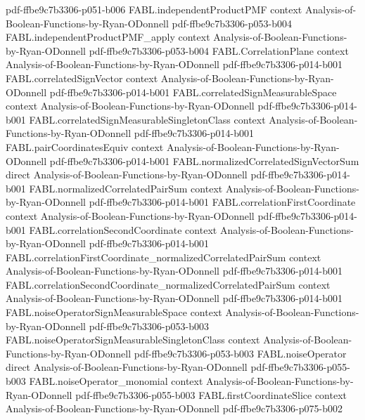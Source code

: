 \begin{theorem}
  {pdf-ffbe9c7b3306-p051-b006}
\proofstep
  {FABL.independentProductPMF}
  {context}
  {Analysis-of-Boolean-Functions-by-Ryan-ODonnell}
  {pdf-ffbe9c7b3306-p053-b004}
\proofstep
  {FABL.independentProductPMF_apply}
  {context}
  {Analysis-of-Boolean-Functions-by-Ryan-ODonnell}
  {pdf-ffbe9c7b3306-p053-b004}
\proofstep
  {FABL.CorrelationPlane}
  {context}
  {Analysis-of-Boolean-Functions-by-Ryan-ODonnell}
  {pdf-ffbe9c7b3306-p014-b001}
\proofstep
  {FABL.correlatedSignVector}
  {context}
  {Analysis-of-Boolean-Functions-by-Ryan-ODonnell}
  {pdf-ffbe9c7b3306-p014-b001}
\proofstep
  {FABL.correlatedSignMeasurableSpace}
  {context}
  {Analysis-of-Boolean-Functions-by-Ryan-ODonnell}
  {pdf-ffbe9c7b3306-p014-b001}
\proofstep
  {FABL.correlatedSignMeasurableSingletonClass}
  {context}
  {Analysis-of-Boolean-Functions-by-Ryan-ODonnell}
  {pdf-ffbe9c7b3306-p014-b001}
\proofstep
  {FABL.pairCoordinatesEquiv}
  {context}
  {Analysis-of-Boolean-Functions-by-Ryan-ODonnell}
  {pdf-ffbe9c7b3306-p014-b001}
\proofstep
  {FABL.normalizedCorrelatedSignVectorSum}
  {direct}
  {Analysis-of-Boolean-Functions-by-Ryan-ODonnell}
  {pdf-ffbe9c7b3306-p014-b001}
\proofstep
  {FABL.normalizedCorrelatedPairSum}
  {context}
  {Analysis-of-Boolean-Functions-by-Ryan-ODonnell}
  {pdf-ffbe9c7b3306-p014-b001}
\proofstep
  {FABL.correlationFirstCoordinate}
  {context}
  {Analysis-of-Boolean-Functions-by-Ryan-ODonnell}
  {pdf-ffbe9c7b3306-p014-b001}
\proofstep
  {FABL.correlationSecondCoordinate}
  {context}
  {Analysis-of-Boolean-Functions-by-Ryan-ODonnell}
  {pdf-ffbe9c7b3306-p014-b001}
\proofstep
  {FABL.correlationFirstCoordinate_normalizedCorrelatedPairSum}
  {context}
  {Analysis-of-Boolean-Functions-by-Ryan-ODonnell}
  {pdf-ffbe9c7b3306-p014-b001}
\proofstep
  {FABL.correlationSecondCoordinate_normalizedCorrelatedPairSum}
  {context}
  {Analysis-of-Boolean-Functions-by-Ryan-ODonnell}
  {pdf-ffbe9c7b3306-p014-b001}
\proofstep
  {FABL.noiseOperatorSignMeasurableSpace}
  {context}
  {Analysis-of-Boolean-Functions-by-Ryan-ODonnell}
  {pdf-ffbe9c7b3306-p053-b003}
\proofstep
  {FABL.noiseOperatorSignMeasurableSingletonClass}
  {context}
  {Analysis-of-Boolean-Functions-by-Ryan-ODonnell}
  {pdf-ffbe9c7b3306-p053-b003}
\proofstep
  {FABL.noiseOperator}
  {direct}
  {Analysis-of-Boolean-Functions-by-Ryan-ODonnell}
  {pdf-ffbe9c7b3306-p055-b003}
\proofstep
  {FABL.noiseOperator_monomial}
  {context}
  {Analysis-of-Boolean-Functions-by-Ryan-ODonnell}
  {pdf-ffbe9c7b3306-p055-b003}
\proofstep
  {FABL.firstCoordinateSlice}
  {context}
  {Analysis-of-Boolean-Functions-by-Ryan-ODonnell}
  {pdf-ffbe9c7b3306-p075-b002}

\end{theorem}
